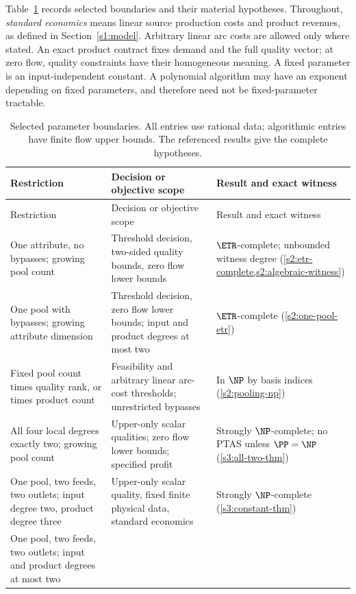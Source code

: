 Table~\ref{s0:boundaries} records selected boundaries and their material
hypotheses. Throughout, \emph{standard economics} means linear source
production costs and product revenues, as defined in
Section~\ref{s1:model}. Arbitrary linear arc costs are allowed only where
stated. An exact product contract fixes demand and the full quality
vector; at zero flow, quality constraints have their homogeneous
meaning. A fixed parameter is an input-independent constant. A polynomial
algorithm may have an exponent depending on fixed parameters, and
therefore need not be fixed-parameter tractable.

{\small
\begin{longtable}{@{}>{\raggedright\arraybackslash}p{}>{\raggedright\arraybackslash}p{}>{\raggedright\arraybackslash}p{}@{}}
\caption{Selected parameter boundaries. All entries use rational data;
algorithmic entries have finite flow upper bounds. The referenced results
give the complete hypotheses.}\label{s0:boundaries}\\
\toprule
Restriction & Decision or objective scope & Result and exact witness\\
\midrule
\endfirsthead
\toprule
Restriction & Decision or objective scope & Result and exact witness\\
\midrule
\endhead
One attribute, no bypasses; growing pool count &
Threshold decision, two-sided quality bounds, zero flow lower bounds &
$\ETR$-complete; unbounded witness degree
(\cref{s2:etr-complete,s2:algebraic-witness})\\[3pt]
One pool with bypasses; growing attribute dimension &
Threshold decision, zero flow lower bounds; input and product degrees
at most two &
$\ETR$-complete
(\cref{s2:one-pool-etr})\\[3pt]
Fixed pool count times quality rank, or times product count &
Feasibility and arbitrary linear arc-cost thresholds; unrestricted bypasses &
In $\NP$ by basis indices
(\cref{s2:pooling-np})\\[3pt]
All four local degrees exactly two; growing pool count &
Upper-only scalar qualities; zero flow lower bounds; specified profit &
Strongly $\NP$-complete; no PTAS unless $\PP=\NP$
(\cref{s3:all-two-thm})\\[3pt]
One pool, two feeds, two outlets; input degree two, product degree three &
Upper-only scalar quality, fixed finite physical data, standard economics &
Strongly $\NP$-complete
(\cref{s3:constant-thm})\\[3pt]
One pool, two feeds, two outlets; input and product degrees at most two &

\end{longtable}}
